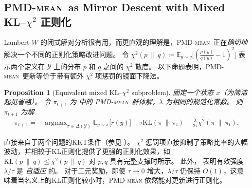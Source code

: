 \documentclass{article}
\theoremstyle{plain}
\newtheorem{proposition}[theorem]{Proposition}
\theoremstyle{definition}
\theoremstyle{remark}
\newcommand{\KL}{\mathrm{KL}}
\newcommand{\E}{\mathbb{E}}
\DeclareMathOperator*{\argmax}{argmax}
\begin{document}
\subsection{\textsc{PMD-mean}\ as Mirror Descent with Mixed KL--$\chi^2$  正则化}
\label{sec:mixed_div}

Lambert-$W$ 的闭式解对分析很有用，而更直观的理解是，\textsc{PMD-mean}\ 正在\emph{确切地}解决一个不同的正则化策略改进问题。  
令 $\chi^2(p~\|~q)\coloneqq\E_{y\sim q}\big[(\frac{p(y)}{q(y)}-1)^2\big]$ 表示两个定义在 $\mathcal{Y}$ 上的分布 $p$ 和 $q$ 之间的 $\chi^2$ 散度。  
以下命题表明，\textsc{PMD-mean}\ 更新等价于带有额外 $\chi^2$ 项惩罚的镜面下降法。

\begin{proposition}[Equivalent mixed KL--$\chi^2$ subproblem]
\label{prop:mixed_subproblem}
    固定一个状态 $x$（为简洁起见省略）。
令 $\pi_{t+1}$ 为  中的 \textsc{PMD-mean}\ 群体解，$\lambda$ 为相同的规范化常数。
则 $\pi_{t+1}$ 为解
    \begin{align}
        \pi_{t+1}
        =&\argmax_{\pi\in\Delta(\mathcal{Y})}
        \E_{y\sim \pi}\big[r(y)\big]
        -\tau\KL(\pi~\|~\pi_t)-\frac{\lambda}{2\tau}\chi^2(\pi~\|~\pi_t).
        \label{eq:mixed_subproblem}
    \end{align}
\end{proposition}
 直接来自于两个问题的KKT条件（参见 ）。  
$\chi^2$ 惩罚项直接抑制了策略比率的大幅波动，并相较于KL正则化提供了更强的正则化效果，如 $\KL(p~\|~q)\leq \chi^2(p~\|~q)$ 对 $p,q$ 具有完整支撑时所示。  
此外， 表明有效强度 $\lambda/\tau$ 是 \emph{自适应} 的。  
对于二元奖励，即使 $\tau\to 0$ 增大，$\lambda/\tau$ 仍保持 $O(1)$，这意味着当名义上的KL正则化较小时，\textsc{PMD-mean} 依然能对更新进行正则化。
\end{document}
